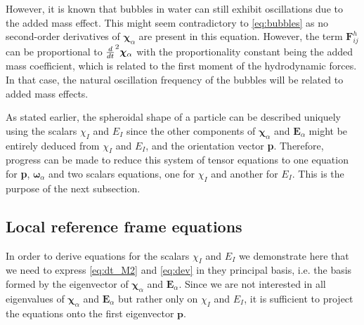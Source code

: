 However, it is known that bubbles in water can still exhibit oscillations due to the added mass effect. 
This might seem contradictory to \ref{eq:bubbles} as no second-order derivatives of $\bm\chi_\alpha$ are present in this equation. 
However, the term $\textbf{F}_{ij}^h$ can be proportional to $\frac{d}{dt}^2 \bm\chi_\alpha$ with the proportionality constant being the added mass coefficient, which is related to the first moment of the hydrodynamic forces. 
In that case, the natural oscillation frequency of the bubbles will be related to added mass effects. 

As stated earlier, the spheroidal shape of a particle can be described uniquely using the scalars $\chi_I$ and $E_I$ since the other components of $\bm\chi_\alpha$ and $\textbf{E}_\alpha$ might be entirely deduced from $\chi_I$ and $E_I$, and the orientation vector \textbf{p}. 
Therefore, progress can be made to reduce this system of tensor equations to one equation for \textbf{p}, $\bm\omega_\alpha$ and two scalars equations, one for $\chi_I$ and another for $E_I$. 
This is the purpose of the next subsection. 


\subsection{Local reference frame equations}

In order to derive equations for the scalars $\chi_I$ and $E_I$ we demonstrate here that we need to express \ref{eq:dt_M2} and \ref{eq:dev} in they principal basis, i.e. the basis formed by the eigenvector of $\bm\chi_\alpha$ and $\textbf{E}_\alpha$. 
Since we are not interested in all eigenvalues of $\bm\chi_\alpha$ and $\textbf{E}_\alpha$ but rather only on $\chi_I$ and $E_I$, it is sufficient to project the equations onto the first eigenvector $\textbf{p}$. 

